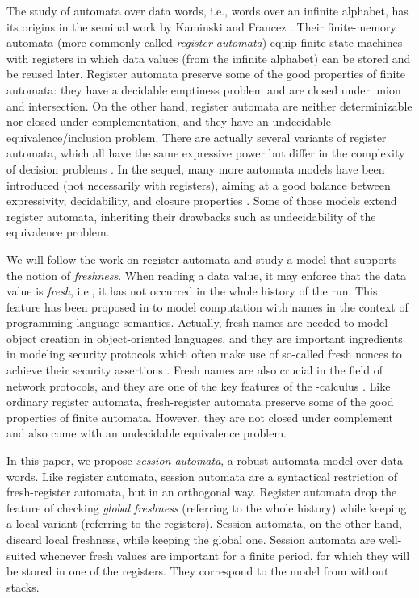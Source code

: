 \documentclass{LMCS}
\begin{document}
The study of automata over data words, i.e., words over an infinite
alphabet, has its origins in the seminal work by Kaminski and Francez
\cite{Kaminski1994}. Their finite-memory automata (more commonly
called \emph{register automata}) equip finite-state machines with
registers in which data values (from the infinite alphabet) can be
stored and be reused later. Register automata preserve some of the
good properties of finite automata: they have a decidable emptiness
problem and are closed under union and intersection. On the other
hand, register automata are neither determinizable nor closed under
complementation, and they have an undecidable equivalence/inclusion
problem. There are actually several variants of register automata,
which all have the same expressive power but differ in the complexity
of decision problems \cite{DL-tocl08,Bjorklund10}.
In the sequel, many more automata models have been introduced (not
necessarily with registers), aiming at a good balance between
expressivity, decidability, and closure properties
\cite{Neven2004,DL-tocl08,KaminskiZ10,BL2010,DBLP:conf/atva/GrumbergKS13,DBLP:conf/lata/GrumbergKS10}.
Some of those models extend register automata, inheriting their
drawbacks such as undecidability of the equivalence problem.

We will follow the work on register automata and study a model that
supports the notion of \emph{freshness}. When reading a data value, it
may enforce that the data value is \emph{fresh}, i.e., it has not
occurred in the whole history of the run. This feature has been
proposed in \cite{DBLP:conf/popl/Tzevelekos11} to model computation
with names in the context of programming-language semantics. Actually,
fresh names are needed to model object creation in object-oriented
languages, and they are
important ingredients in modeling security protocols which often make
use of so-called fresh nonces to achieve their security assertions
\cite{DBLP:conf/ccs/KurtzKW07}. Fresh names are also crucial in the
field of network protocols, and they are one of the key features of
the -calculus \cite{MPW92}. Like ordinary register automata,
fresh-register automata preserve some of the good properties of finite
automata. However, they are not closed under complement and also come
with an undecidable equivalence problem.

In this paper, we propose \emph{session automata}, a robust automata
model over data words.
Like register automata, session automata are a syntactical restriction
of fresh-register automata, but in an orthogonal way. Register
automata drop the feature of checking \emph{global freshness} (referring to the
whole history) while keeping a local variant (referring to the
registers). Session automata, on the other hand, discard local
freshness, while keeping the global one. Session automata are
well-suited whenever fresh values are important for a finite period,
for which they will be stored in one of the registers. They correspond
to the model from \cite{BCGK-fossacs12} without stacks. 
\end{document}
